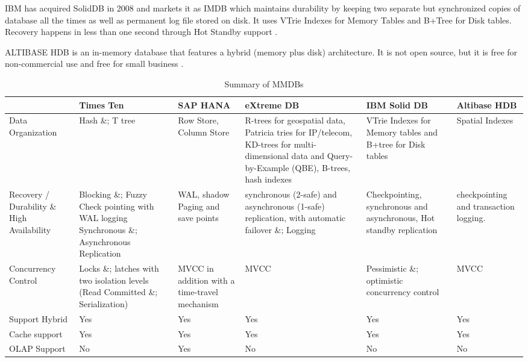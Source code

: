 \documentclass[12pt]{article} %
\begin{document}
IBM has acquired SolidDB in 2008 and markets it as IMDB which maintains durability by keeping two separate but synchronized copies of database all the times as well as permanent log file stored on disk. It uses VTrie Indexes for Memory Tables and B+Tree for Disk tables. Recovery happens in less than one second through Hot Standby support \cite{IBMredbookSolidDB}. 

ALTIBASE HDB is an in-memory database that features a hybrid (memory plus disk) architecture. It is not open source, but it is free for non-commercial use and free for small business \cite{altibaseHDB}.

\begin{table}
\footnotesize
  \begin{center}
    \begin{tabular}{|p{2cm}|p{2cm}p{2cm}p{2cm}p{2cm}p{2cm}|}
      \hline
      & Times Ten & SAP HANA & eXtreme DB & IBM Solid DB & Altibase HDB \\
      \hline
      Data Organization
      &
      Hash \&; T tree
      &
      Row Store, Column Store
      &
      R-trees for geospatial data, Patricia tries for IP/telecom, KD-trees for multi-dimensional data and Query-by-Example (QBE), B-trees, hash indexes
      &
      VTrie Indexes for Memory tables and B+tree for Disk tables
      &
      Spatial Indexes \\
      \hline
      Recovery / Durability \& High Availability
      &
      Blocking \&; Fuzzy Check pointing with WAL logging Synchronous \&; Asynchronous Replication
      &
      WAL, shadow Paging and save points
      &
      synchronous (2-safe) and asynchronous (1-safe) replication, with automatic failover \&; Logging
      &
      Checkpointing, synchronous and asynchronous, Hot standby replication 
      &
      checkpointing and transaction logging. \\
      \hline
      Concurrency Control &Locks \&; latches with two isolation levels (Read Committed \&; Serialization)&MVCC in addition with a time-travel mechanism&MVCC&Pessimistic \&; optimistic concurrency control& MVCC \\
      \hline
      Support Hybrid&Yes&Yes&Yes&Yes&Yes \\
      \hline
      Cache support&Yes&Yes&Yes&Yes&Yes \\
      \hline
      OLAP Support
      &No&Yes&No&No&No \\
      \hline
      \end{tabular}
      \caption{Summary of MMDBs}
      \label{table:nonlin}
    \end{center}
  \end{table}
\normalsize
\end{document}
